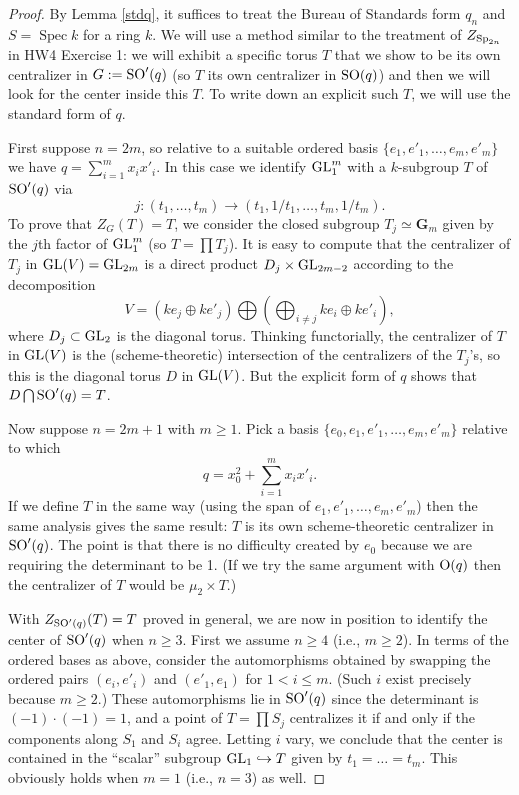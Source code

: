 \documentclass[10pt]{article}
\renewcommand{\(}{\left(}
\renewcommand{\)}{\right)}
\newcommand{\Spec}{\operatorname{Spec}}
\numberwithin{thm}{subsection}
\begin{document}
\begin{proof}
By Lemma \ref{stdq}, it suffices to treat the  Bureau of Standards form $q_n$
and $S = \Spec k$ for a ring $k$.
We will use a method similar to 
the treatment of $Z_{{\rm{Sp}}_{2n}}$ in HW4 Exercise 1:  we will exhibit a specific 
torus $T$ that we show to be its own centralizer in $G := {\rm{SO}}'(q)$
(so $T$ its own centralizer in ${\rm{SO}}(q)$) 
and then we will look for the center inside this $T$.  To write down an explicit such $T$, we will
use the standard form of $q$.  

First suppose $n = 2m$, so relative to a suitable ordered basis $\{e_1, e'_1, \dots,
e_m, e'_m\}$ we have 
$q = \sum_{i=1}^m x_i x'_i$.    In this case we identify ${\rm{GL}}_1^m$
with a $k$-subgroup $T$ of ${\rm{SO}}'(q)$ via
$$j:(t_1, \dots, t_m) \rightarrow (t_1, 1/t_1, \dots, t_m, 1/t_m).$$
To prove that $Z_G(T) = T$, we consider the closed subgroup $T_j \simeq
{\mathbf{G}}_m$ given by the $j$th factor of ${\rm{GL}}_1^m$ (so $T = \prod T_j$). 
It is easy to compute that the centralizer of $T_j$ in ${\rm{GL}}(V) = {\rm{GL}}_{2m}$
is a direct product $D_j \times {\rm{GL}}_{2m-2}$ according to the decomposition
$$V = (k e_j  \oplus k e'_j) \bigoplus (\bigoplus_{i \ne j} k e_i \oplus k e'_i),$$
where $D_j \subset {\rm{GL}}_2$ is the diagonal torus.
Thinking functorially, the centralizer of $T$ in ${\rm{GL}}(V)$ is the (scheme-theoretic) 
intersection of the centralizers of the $T_j$'s, so this is the  diagonal torus $D$ in
${\rm{GL}}(V)$.  But the explicit form of $q$ shows that $D \bigcap {\rm{SO}}'(q) = T$.

Now suppose $n = 2m+1$ with $m \ge 1$.  Pick a basis
$\{e_0, e_1, e'_1,\dots, e_m, e'_m\}$ relative to which
$$q = x_0^2 + \sum_{i=1}^m x_i x'_i.$$
If we define $T$ in the same way (using the span of $e_1, e'_1, \dots, e_m,  e'_m$)
then the same analysis gives the same result: $T$ is its own scheme-theoretic
centralizer in ${\rm{SO}}'(q)$.  The point is that there is no difficulty
created by $e_0$ because we are requiring the determinant to be 1.
(If we try the same argument with ${\rm{O}}(q)$ then the centralizer of $T$ would be
$\mu_2 \times T$.)  

With $Z_{{\rm{SO}}'(q)}(T) = T$ proved in general, we are now in position to identify
the center of ${\rm{SO}}'(q)$ when $n \ge 3$.  First we assume $n \ge 4$ (i.e., $m \ge 2$).
 In terms of the ordered bases as above, consider
the automorphisms obtained by swapping the ordered pairs 
$(e_i, e'_i)$ and $(e'_1, e_1)$ for $1 < i \le m$.  
(Such $i$ exist precisely because $m \ge 2$.)  These automorphisms lie in
${\rm{SO}}'(q)$ since the determinant is
$(-1) \cdot (-1) = 1$, and a point of $T = \prod S_j$ centralizes it if and only if
the components along $S_1$ and $S_i$ agree.  Letting $i$ vary, we conclude
that the center is contained in the ``scalar'' subgroup
${\rm{GL}}_1 \hookrightarrow T$ given by $t_1 = \dots = t_m$.
This obviously holds when $m = 1$ (i.e., $n = 3$) as well. 


\end{proof}
\end{document}
